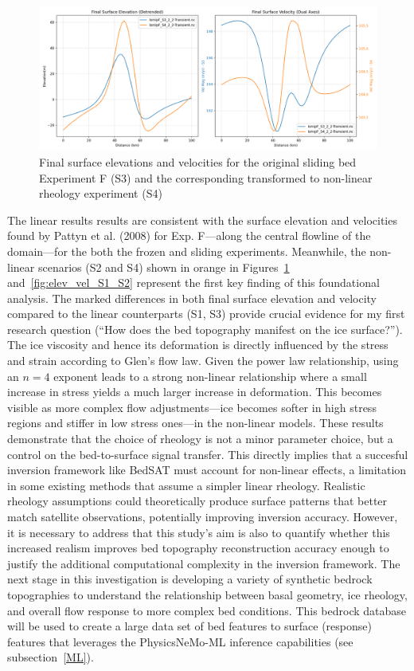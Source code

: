 \begin{figure}[H]
    \includegraphics[scale=0.40]{figures/combined_elevation_detrended_surface_velocity_['S3']_['S4'].png}
    \caption{Final surface elevations and velocities for the original sliding bed Experiment F (S3) and the corresponding transformed to non-linear rheology experiment (S4)}
    \label{fig:elev_vel_S3_S4}
\end{figure}
The linear results results are consistent with the surface elevation and velocities found by Pattyn et al. (2008) for Exp. F—along the central flowline of the domain—for the both the frozen and sliding experiments. Meanwhile, the non-linear scenarios (S2 and S4) shown in orange in Figures~\ref{fig:elev_vel_S3_S4} and~\ref{fig:elev_vel_S1_S2} represent the first key finding of this foundational analysis. The marked differences in both final surface elevation and velocity compared to the linear counterparts (S1, S3) provide crucial evidence for my first research question (``How does the bed topography manifest on the ice surface?''). The ice viscosity and hence its deformation is directly influenced by the stress and strain according to Glen's flow law. Given the power law relationship, using an $n = 4$ exponent leads to a strong non-linear relationship where a small increase in stress yields a much larger increase in deformation. This becomes visible as more complex flow adjustments—ice becomes softer in high stress regions and stiffer in low stress ones—in the non-linear models. These results demonstrate that the choice of rheology is not a minor parameter choice, but a control on the bed-to-surface signal transfer. This directly implies that a succesful inversion framework like BedSAT must account for non-linear effects, a limitation in some existing methods that assume a simpler linear rheology.
Realistic rheology assumptions could theoretically produce surface patterns that better match satellite observations, potentially improving inversion accuracy. However, it is necessary to address that this study's aim is also to quantify whether this increased realism improves bed topography reconstruction accuracy enough to justify the additional computational complexity in the inversion framework. The next stage in this investigation is developing a variety of synthetic bedrock topographies to understand the relationship between basal geometry, ice rheology, and overall flow response to more complex bed conditions. This bedrock database will be used to create a large data set of bed features to surface (response) features that leverages the PhysicsNeMo-ML inference capabilities (see subsection~\ref{ML}).

